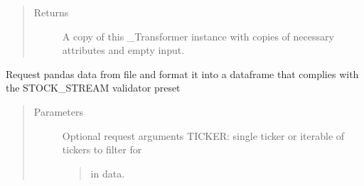 \documentclass[letterpaper,10pt,english]{sphinxmanual}
\begin{document}
\begin{fulllineitems}
\begin{fulllineitems}
\begin{quote}
\begin{description}
\begin{itemize}
\end{itemize}

\item[{Returns}] \leavevmode
A copy of this \_Transformer instance with copies of necessary
attributes and empty input.

\end{description}\end{quote}

\end{fulllineitems}


\begin{fulllineitems}
\label{\detokenize{dalio.translator:dalio.translator.file.StockStreamFileTranslator.run}}
Request pandas data from file and format it into a dataframe that
complies with the STOCK\_STREAM validator preset
\begin{quote}\begin{description}
\item[{Parameters}] \leavevmode
{} \textendash{} 
Optional request arguments
TICKER: single ticker or iterable of tickers to filter for
\begin{quote}

in data.
\end{quote}


\end{description}\end{quote}

\end{fulllineitems}


\begin{fulllineitems}
\label{\detokenize{dalio.translator:dalio.translator.file.StockStreamFileTranslator.translations}}
\end{fulllineitems}


\end{fulllineitems}
\end{document}
